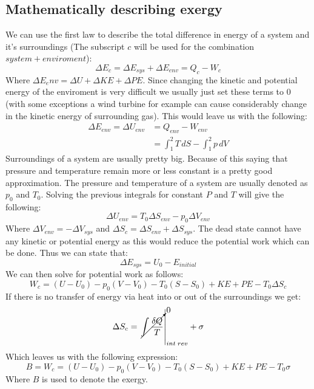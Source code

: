 \documentclass[11pt, a4paper]{article}
\begin{document}
\subsection{Mathematically describing exergy}
We can use the first law to describe the total difference in energy of a system and it's surroundings (The subscript $c$ will be used for the combination $system+enviroment$):
\begin{equation}
  \Delta E_c = \Delta E_{sys} + \Delta E_{env} = Q_c - W_c
\end{equation}
Where $\Delta E_env = \Delta U + \Delta KE + \Delta PE$. Since changing the kinetic and potential energy of the enviroment is very difficult we usually just set these terms to $0$ (with some exceptions a wind turbine for example can cause considerably change in the kinetic energy of surrounding gas). This would leave us with the following:
\begin{align}
  \Delta E_{env} = \Delta U_{env} &= Q_{env} - W_{env}\\
  &= \int_1^2 T\,dS - \int_1^2 p\,dV
\end{align} 
Surroundings of a system are usually pretty big. Because of this saying that pressure and temperature remain more or less constant is a pretty good approximation. The pressure and temperature of a system are usually denoted as $p_0$ and $T_0$. Solving the previous integrals for constant $P$ and $T$ will give the following:
\begin{equation}
  \Delta U_{env} = T_0\Delta S_{env} - p_0 \Delta V_{env}
\end{equation}
Where $\Delta V_{env} = - \Delta V_{sys}$ and $\Delta S_c = \Delta S_{env} + \Delta S_{sys}$. The dead state cannot have any kinetic or potential energy as this would reduce the potential work which can be done. Thus we can state that:
\begin{equation}
  \Delta E_{sys} = U_0 - E_{initial}
\end{equation}
We can then solve for potential work as follows:
\begin{equation}
  W_c = (U - U_0) - p_0(V-V_0) - T_0(S-S_0) + KE + PE - T_0\Delta S_c
\end{equation}
If there is no transfer of energy via heat into or out of the surroundings we get:
\begin{equation}
  \Delta S_c = \left. \cancelto{0}{\int \frac{\delta Q}{T}} \right|_{int\;rev} + \sigma
\end{equation}
Which leaves us with the following expression:
\begin{equation}
  B = W_c = (U - U_0) - p_0(V-V_0) - T_0(S-S_0) + KE + PE - T_0\sigma
\end{equation}
Where $B$ is used to denote the exergy.
\end{document}
